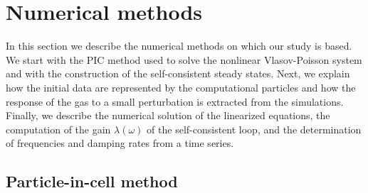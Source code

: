 \section{Numerical methods}
\label{Sec:Numerics}

In this section we describe the numerical methods on which our study is based. We start with the PIC method used to solve the nonlinear Vlasov-Poisson system and with the construction of the self-consistent steady states. Next, we explain how the initial data are represented by the computational particles and how the response of the gas to a small perturbation is extracted from the simulations. Finally, we describe the numerical solution of the linearized equations, the computation of the gain $\lambda(\omega)$ of the self-consistent loop, and the determination of frequencies and damping rates from a time series.


\subsection{Particle-in-cell method}
\label{SubSec:PIC}

